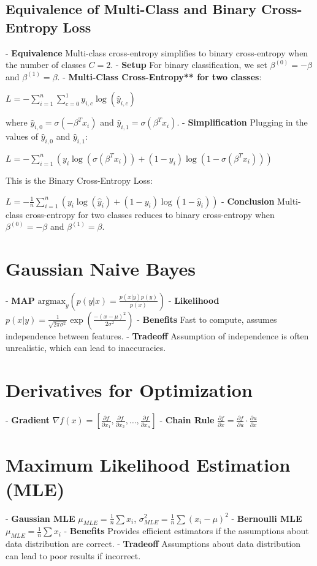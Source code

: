 \documentclass[10pt]{article}
\begin{document}
\begin{multicols}{2}
\subsection*{Equivalence of Multi-Class and Binary Cross-Entropy Loss}
- \textbf{Equivalence} Multi-class cross-entropy simplifies to binary cross-entropy when the number of classes $C = 2$.
- \textbf{Setup} For binary classification, we set $\beta^{(0)} = -\beta$ and $\beta^{(1)} = \beta$.
- \textbf{Multi-Class Cross-Entropy** for two classes}:
  
  $L = -\sum_{i=1}^{n} \sum_{c=0}^{1} y_{i,c} \log(\hat{y}_{i,c})$
  
  where $\hat{y}_{i,0} = \sigma(-\beta^T x_i)$ and $\hat{y}_{i,1} = \sigma(\beta^T x_i)$.
- \textbf{Simplification} Plugging in the values of $\hat{y}_{i,0}$ and $\hat{y}_{i,1}$:
  
  $L = -\sum_{i=1}^{n} \left( y_i \log(\sigma(\beta^T x_i)) + (1 - y_i) \log(1 - \sigma(\beta^T x_i)) \right)$
  
 This is the Binary Cross-Entropy Loss:
  
  $L = -\frac{1}{n} \sum_{i=1}^{n} \left( y_i \log(\hat{y}_i) + (1 - y_i) \log(1 - \hat{y}_i) \right)$
- \textbf{Conclusion} Multi-class cross-entropy for two classes reduces to binary cross-entropy when $\beta^{(0)} = -\beta$ and $\beta^{(1)} = \beta$.



\section*{Gaussian Naive Bayes}
- \textbf{MAP} $\text{argmax}_y \left( p(y|x) = \frac{p(x|y)p(y)}{p(x)} \right)$
- \textbf{Likelihood} $p(x|y) = \frac{1}{\sqrt{2\pi\sigma^2}} \exp\left(\frac{-(x-\mu)^2}{2\sigma^2}\right)$
- \textbf{Benefits} Fast to compute, assumes independence between features.
- \textbf{Tradeoff} Assumption of independence is often unrealistic, which can lead to inaccuracies.

\section*{Derivatives for Optimization}
- \textbf{Gradient} $\nabla f(x) = \left[\frac{\partial f}{\partial x_1}, \frac{\partial f}{\partial x_2}, \dots, \frac{\partial f}{\partial x_n}\right]$
- \textbf{Chain Rule} $\frac{\partial f}{\partial x} = \frac{\partial f}{\partial u} \cdot \frac{\partial u}{\partial x}$

\section*{Maximum Likelihood Estimation (MLE)}
- \textbf{Gaussian MLE} $\mu_{MLE} = \frac{1}{n} \sum x_i$, \quad $\sigma_{MLE}^2 = \frac{1}{n} \sum (x_i - \mu)^2$
- \textbf{Bernoulli MLE} $\mu_{MLE} = \frac{1}{n} \sum x_i$
- \textbf{Benefits} Provides efficient estimators if the assumptions about data distribution are correct.
- \textbf{Tradeoff} Assumptions about data distribution can lead to poor results if incorrect.


\end{multicols}
\end{document}
